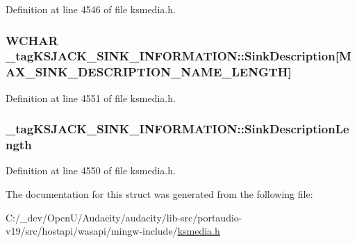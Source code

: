 Definition at line 4546 of file ksmedia.\+h.

\subsubsection[{\texorpdfstring{Sink\+Description}{SinkDescription}}]{\setlength{\rightskip}{0pt plus 5cm}W\+C\+H\+AR \+\_\+tag\+K\+S\+J\+A\+C\+K\+\_\+\+S\+I\+N\+K\+\_\+\+I\+N\+F\+O\+R\+M\+A\+T\+I\+O\+N\+::\+Sink\+Description\mbox{[}{\bf M\+A\+X\+\_\+\+S\+I\+N\+K\+\_\+\+D\+E\+S\+C\+R\+I\+P\+T\+I\+O\+N\+\_\+\+N\+A\+M\+E\+\_\+\+L\+E\+N\+G\+TH}\mbox{]}}\hypertarget{struct__tag_k_s_j_a_c_k___s_i_n_k___i_n_f_o_r_m_a_t_i_o_n_a8e88d8a5f68f7929ba69fa3da5544ea6}{}\label{struct__tag_k_s_j_a_c_k___s_i_n_k___i_n_f_o_r_m_a_t_i_o_n_a8e88d8a5f68f7929ba69fa3da5544ea6}


Definition at line 4551 of file ksmedia.\+h.

\subsubsection[{\texorpdfstring{Sink\+Description\+Length}{SinkDescriptionLength}}]{ \+\_\+tag\+K\+S\+J\+A\+C\+K\+\_\+\+S\+I\+N\+K\+\_\+\+I\+N\+F\+O\+R\+M\+A\+T\+I\+O\+N\+::\+Sink\+Description\+Length}\hypertarget{struct__tag_k_s_j_a_c_k___s_i_n_k___i_n_f_o_r_m_a_t_i_o_n_ae06013e901d67da0d50294fd60e4dfb3}{}\label{struct__tag_k_s_j_a_c_k___s_i_n_k___i_n_f_o_r_m_a_t_i_o_n_ae06013e901d67da0d50294fd60e4dfb3}


Definition at line 4550 of file ksmedia.\+h.



The documentation for this struct was generated from the following file\+:\begin{DoxyCompactItemize}
\item 
C\+:/\+\_\+dev/\+Open\+U/\+Audacity/audacity/lib-\/src/portaudio-\/v19/src/hostapi/wasapi/mingw-\/include/\hyperlink{ksmedia_8h}{ksmedia.\+h}\end{DoxyCompactItemize}

